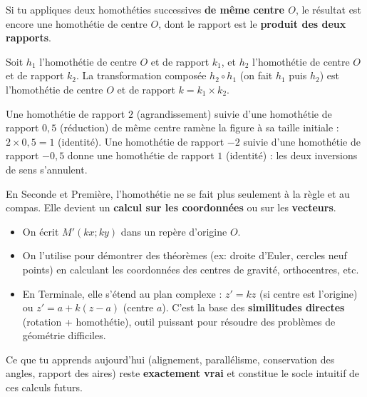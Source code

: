 \documentclass[11pt]{article}
\begin{document}
Si tu appliques deux homothéties successives \textbf{de même centre $O$}, le résultat est encore une homothétie de centre $O$, dont le rapport est le \textbf{produit des deux rapports}.

\begin{propriete}
Soit $h_1$ l'homothétie de centre $O$ et de rapport $k_1$, et $h_2$ l'homothétie de centre $O$ et de rapport $k_2$.
La transformation composée $h_2 \circ h_1$ (on fait $h_1$ puis $h_2$) est l'homothétie de centre $O$ et de rapport $k = k_1 \times k_2$.
\end{propriete}

\begin{exemplebox}[Illustration]
Une homothétie de rapport $2$ (agrandissement) suivie d'une homothétie de rapport $0,5$ (réduction) de même centre ramène la figure à sa taille initiale : $2 \times 0,5 = 1$ (identité).
Une homothétie de rapport $-2$ suivie d'une homothétie de rapport $-0,5$ donne une homothétie de rapport $1$ (identité) : les deux inversions de sens s'annulent.
\end{exemplebox}

\begin{savaistu}
En Seconde et Première, l'homothétie ne se fait plus seulement à la règle et au compas. Elle devient un \textbf{calcul sur les coordonnées} ou sur les \textbf{vecteurs}.
\begin{itemize}
    \item On écrit $M'(kx ; ky)$ dans un repère d'origine $O$.
    \item On l'utilise pour démontrer des théorèmes (ex: droite d'Euler, cercles neuf points) en calculant les coordonnées des centres de gravité, orthocentres, etc.
    \item En Terminale, elle s'étend au plan complexe : $z' = k z$ (si centre est l'origine) ou $z' = a + k(z-a)$ (centre $a$). C'est la base des \textbf{similitudes directes} (rotation + homothétie), outil puissant pour résoudre des problèmes de géométrie difficiles.
\end{itemize}
Ce que tu apprends aujourd'hui (alignement, parallélisme, conservation des angles, rapport des aires) reste \textbf{exactement vrai} et constitue le socle intuitif de ces calculs futurs.
\end{savaistu}
\end{document}
